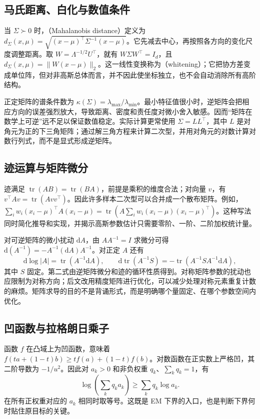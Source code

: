 \documentclass[UTF8]{ctexart}
\begin{document}
\subsection{马氏距离、白化与数值条件}
当 $\Sigma\succ0$ 时，（Mahalanobis distance）定义为 $d_\Sigma(x,\mu)=\sqrt{(x-\mu)^\top\Sigma^{-1}(x-\mu)}$。它先减去中心，再按照各方向的变化尺度调整距离。取 $W=\Lambda^{-1/2}U^\top$，就有 $W\Sigma W^\top=I_d$，且 $d_\Sigma(x,\mu)=\|W(x-\mu)\|_2$。这一线性变换称为（whitening）；它把协方差变成单位阵，但对非高斯总体而言，并不因此使坐标独立，也不会自动消除所有高阶结构。

正定矩阵的谱条件数为 $\kappa(\Sigma)=\lambda_{\max}/\lambda_{\min}$。最小特征值很小时，逆矩阵会把相应方向的误差强烈放大，导致距离、密度和责任度对微小舍入敏感。因而“矩阵在数学上可逆”远不足以保证数值稳定。实际计算更常使用 $\Sigma=LL^\top$，其中 $L$ 是对角元为正的下三角矩阵；通过解三角方程来计算二次型，并用对角元的对数计算对数行列式，而不是显式形成逆矩阵。

\subsection{迹运算与矩阵微分}
迹满足 $\operatorname{tr}(AB)=\operatorname{tr}(BA)$，前提是乘积的维度合法；对向量 $v$，有 $v^\top Av=\operatorname{tr}(Avv^\top)$。因此许多样本二次型可以合并成一个散布矩阵。例如，$\sum_iw_i(x_i-\mu)^\top A(x_i-\mu)=\operatorname{tr}(A\sum_iw_i(x_i-\mu)(x_i-\mu)^\top)$。这种写法同时简化推导和实现，并揭示高斯参数估计只需要零阶、一阶、二阶加权统计量。

对可逆矩阵的微小扰动 $\mathrm dA$，由 $AA^{-1}=I$ 求微分可得 $\mathrm d(A^{-1})=-A^{-1}(\mathrm dA)A^{-1}$。对正定 $A$ 还有
\begin{equation}
\mathrm d\log|A|=\operatorname{tr}(A^{-1}\mathrm dA),\qquad
\mathrm d\operatorname{tr}(A^{-1}S)=-\operatorname{tr}(A^{-1}SA^{-1}\mathrm dA),
\label{eq:gmm-matrix-differential}
\end{equation}
其中 $S$ 固定。第二式由逆矩阵微分和迹的循环性质得到。对称矩阵参数的扰动也应限制为对称方向；后文改用精度矩阵进行优化，可以减少处理对称元素重复计数的麻烦。矩阵求导的目的不是背诵形式，而是明确哪个量固定、在哪个参数空间内优化。

\subsection{凹函数与拉格朗日乘子}
函数 $f$ 在凸域上为凹函数，意味着 $f(ta+(1-t)b)\geq tf(a)+(1-t)f(b)$。对数函数在正实数上严格凹，其二阶导数为 $-1/u^2$。因此对 $a_k>0$ 和非负权重 $q_k$、$\sum_kq_k=1$，有
\begin{equation}
\log\!\left(\sum_kq_ka_k\right)\geq\sum_kq_k\log a_k.
\label{eq:gmm-jensen}
\end{equation}
在所有正权重对应的 $a_k$ 相同时取等号。这既是 EM 下界的入口，也是判断下界何时贴住原目标的关键。
\end{document}
